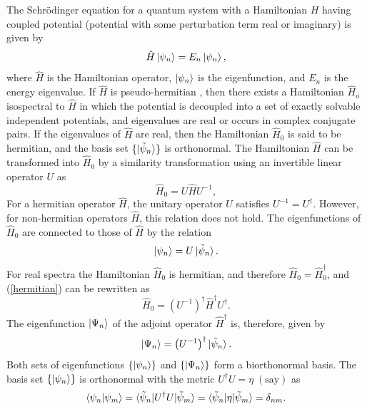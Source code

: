 \documentclass[a4paper, 12pt]{article}
\begin{document}
The Schrödinger equation for a quantum system with a Hamiltonian \( H \) having coupled potential (potential with some perturbation term real or imaginary) is given by
\begin{equation}
    \hat{H}\ket{\psi_n}=E_n\ket{\psi_n},
\end{equation}
where \( \hat{H} \) is the Hamiltonian operator, \( \ket{\psi_n} \) is the eigenfunction, and \( E_n \) is the energy eigenvalue. If \( \hat{H} \) is pseudo-hermitian \cite{mostafazadeh2002pseudo1}, then there exists a Hamiltonian \( \hat{H}_o \) isospectral to \( \hat{H} \) in which the potential is decoupled into a set of exactly solvable independent potentials, and eigenvalues are real or occurs in complex conjugate pairs. If the eigenvalues of \( \hat{H} \) are real, then the Hamiltonian \( \hat{H}_0 \) is said to be hermitian, and the basis set \( \{\ket{\tilde{\psi}_n}\} \) is orthonormal. The Hamiltonian \( \hat{H} \) can be transformed into \( \hat{H}_0 \) by a similarity transformation using an invertible linear operator \( U \) as
\begin{equation}\label{hermitian}
    \hat{H}_0=U\hat{H}U^{-1},
\end{equation}
For a hermitian operator \( \hat{H} \), the unitary operator \( U \) satisfies \( U^{-1}=U^{\dagger} \). However, for non-hermitian operators \( \hat{H} \), this relation does not hold. The eigenfunctions of \( \hat{H}_0 \) are connected to those of \( \hat{H} \) by the relation
\begin{equation}
    \ket{\psi_n}=U\ket{\tilde{\psi}_n}.
\end{equation}
For real spectra the Hamiltonian \( \hat{H}_0 \) is hermitian, and therefore \( \hat{H}_0=\hat{H}_0^{\dagger} \), and (\ref{hermitian}) can be rewritten as
\begin{equation}\label{hermitian-dag}
    \hat{H}_0=\left(U^{-1}\right)^{\dagger}\hat{H}^{\dagger}U^{\dagger}.
\end{equation}
The eigenfunction \( \ket{\Psi_n} \) of the adjoint operator \( \hat{H}^{\dagger} \) is, therefore, given by
\begin{equation}
    \ket{\Psi_n}=\left(U^{-1}\right)^{\dagger}\ket{\tilde{\psi}_n}.
\end{equation}
Both sets of eigenfunctions \( \{\ket{\psi_n}\} \) and \( \{\ket{\Psi_n}\} \) form a biorthonormal basis. The basis set \( \{\ket{\psi_n}\} \) is orthonormal with the metric \( U^{\dagger}U=\eta\;(\text{say}) \) as
\begin{equation}
    \braket{\psi_n|\psi_m}=\braket{\tilde{\psi}_n|U^{\dagger}U|\tilde{\psi}_m}=\braket{\tilde{\psi}_n|\eta|\tilde{\psi}_m}=\delta_{nm}.
\end{equation}
\end{document}
